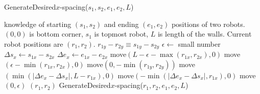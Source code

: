 \begin{algorithm}
\caption{GenerateDesired$x$-spacing($s_1,s_2,e_1,e_2,L$)}\label{alg:XControl}
\begin{algorithmic}[1]
\Require knowledge of starting $(s_1,s_2)$ and ending $(e_1,e_2)$ positions of  two robots. 
$(0,0)$ is bottom corner, $s_1$ is topmost robot, 
 $L$ is length of the walls. Current robot positions are $(r_1,r_2)$.
\Ensure   $ r_{1y} - r_{2y}  \equiv s_{1y} - s_{2y} $   %
\State $\epsilon \gets $ small number
\State $ \Delta s_x  \gets s_{1x} - s_{2x} $
\State $ \Delta e_x \gets e_{1x} - e_{2x} $
\State move$( L-\epsilon-\max( r_{1x},r_{2x}) ,0)   $ 
\Else 
\State  move$ ( \epsilon-\min( r_{1x},r_{2x}),0 )    $ 
\EndIf
\State move$(0, -\min( r_{1y},r_{2y} ))$ 
\State move$(\min(|\Delta e_x - \Delta s_x |, L- r_{1x}), 0)$  
\Else
\State move$(-\min(|\Delta e_x - \Delta s_x |, r_{1x}), 0)$
\EndIf 
\State move$(0, \epsilon)$ 
\State  \Return $(r_1,r_2)$
\Else   
\State \Return GenerateDesired$x$-spacing($r_1,r_2,e_1,e_2,L$)
\EndIf
\end{algorithmic}
\end{algorithm}


